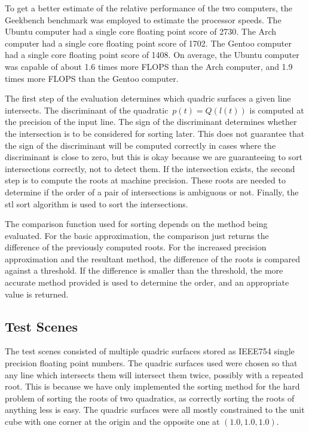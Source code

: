 \documentclass{cccg16}
\begin{document}
To get a better estimate of the relative performance of the two
computers, the Geekbench benchmark was employed to estimate the
processor speeds.  The Ubuntu computer had a single core floating
point score of 2730.  The Arch computer had a single core floating
point score of 1702.  The Gentoo computer had a single core floating
point score of 1408.  On average, the Ubuntu computer was capable of
about 1.6 times more FLOPS than the Arch computer, and 1.9 times more
FLOPS than the Gentoo computer.

The first step of the evaluation determines which quadric surfaces a
given line intersects.  The discriminant of the
quadratic~$p(t)=Q(l(t))$ is computed at the precision of the input
line.  The sign of the discriminant determines whether the
intersection is to be considered for sorting later.  This does not
guarantee that the sign of the discriminant will be computed correctly
in cases where the discriminant is close to zero, but this is okay
because we are guaranteeing to sort intersections correctly, not to
detect them.  If the intersection exists, the second step is to
compute the roots at machine precision.  These roots are needed to
determine if the order of a pair of intersections is ambiguous or not.
Finally, the stl sort algorithm is used to sort the intersections.

The comparison function used for sorting depends on the method being
evaluated.  For the basic approximation, the comparison just returns
the difference of the previously computed roots.  For the increased
precision approximation and the resultant method, the difference of
the roots is compared against a threshold.  If the difference is
smaller than the threshold, the more accurate method provided is used
to determine the order, and an appropriate value is returned.

\subsection{Test Scenes}
The test scenes consisted of multiple quadric surfaces stored as
IEEE754 single precision floating point numbers.  The quadric surfaces
used were chosen so that any line which intersects them will intersect
them twice, possibly with a repeated root.  This is because we have
only implemented the sorting method for the hard problem of sorting
the roots of two quadratics, as correctly sorting the roots of
anything less is easy.  The quadric surfaces were all mostly
constrained to the unit cube with one corner at the origin and the
opposite one at $(1.0, 1.0, 1.0)$.
\end{document}
